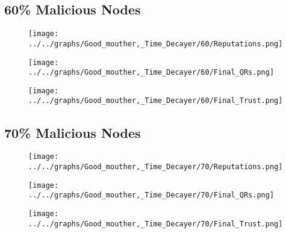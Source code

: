 \begin{minipage}[t]{0.49\columnwidth}
\subsection*{60\% Malicious Nodes}
    \begin{figure}[H]
        \centering
        \texttt{[image: ../../graphs/Good\_mouther,\_Time\_Decayer/60/Reputations.png]}
    \end{figure}
    \begin{figure}[H]
        \centering
        \texttt{[image: ../../graphs/Good\_mouther,\_Time\_Decayer/60/Final\_QRs.png]}
    \end{figure}
\end{minipage}
\begin{minipage}[t]{0.49\columnwidth}
    \begin{figure}[H]
        \centering
        \texttt{[image: ../../graphs/Good\_mouther,\_Time\_Decayer/60/Final\_Trust.png]}
    \end{figure}
\end{minipage}

\begin{minipage}[t]{0.49\columnwidth}
\subsection*{70\% Malicious Nodes}
    \begin{figure}[H]
        \centering
        \texttt{[image: ../../graphs/Good\_mouther,\_Time\_Decayer/70/Reputations.png]}
    \end{figure}
    \begin{figure}[H]
        \centering
        \texttt{[image: ../../graphs/Good\_mouther,\_Time\_Decayer/70/Final\_QRs.png]}
    \end{figure}
\end{minipage}
\begin{minipage}[t]{0.49\columnwidth}
    \begin{figure}[H]
        \centering
        \texttt{[image: ../../graphs/Good\_mouther,\_Time\_Decayer/70/Final\_Trust.png]}
    \end{figure}
\end{minipage}

